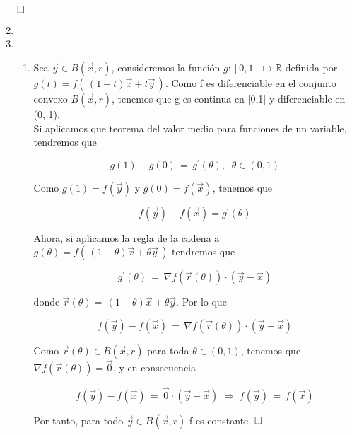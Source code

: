 \documentclass[12pt]{article}
\newcommand{\Rn}[1]{\mathbb{R}^{#1}}
\begin{document}
\begin{enumerate}
	  $\hfill \square$
	  
	  \pagebreak
	  
	  \item 
	  
	  \item 
	  \begin{enumerate}
	      \item Sea $\vec{y} \in B(\vec{x}, r)$, consideremos la función $g:[0,1] \mapsto \Rn{}$ definida por \linebreak $g(t) = f(\, (1-t)\vec{x} + t \vec{y} \, )$. Como f es diferenciable en el conjunto convexo $B(\vec{x}, r)$, tenemos que g es continua en [0,1] y diferenciable en (0, 1). \\
	      
	      Si aplicamos que teorema del valor medio para funciones de un variable, tendremos que 
	      
	      $$g(1) - g(0) \, = \, g^{\prime}(\theta), \;\; \theta \in (0,1)$$
	      
	      Como $g(1) = f(\vec{y})$ y $g(0) = f(\vec{x})$, tenemos que
	      
	      $$f(\vec{y}) - f(\vec{x}) = g^{\prime}(\theta)$$
	      
	      Ahora, si aplicamos la regla de la cadena a $g(\theta) =  f(\, (1-\theta)\vec{x} + \theta \vec{y} \, ) $ tendremos que
	      
	      $$ g^{\prime}(\theta) \, = \, \nabla f(\vec{r}(\theta)) \cdot (\vec{y} - \vec{x})$$
	      
	      donde $\vec{r}(\theta) = \, (1-\theta)\vec{x} + \theta \vec{y} $. Por lo que 
	      
	      $$f(\vec{y}) - f(\vec{x}) \, = \, \nabla f(\vec{r}(\theta)) \cdot (\vec{y} - \vec{x})$$
	      
	      Como $ \vec{r}(\theta) \in B(\vec{x}, r)$ para toda $\theta \in (0,1)$, tenemos que $\nabla f(\vec{r}(\theta)) = \vec{0}$, y en consecuencia
	      
	      $$ f(\vec{y}) - f(\vec{x}) \, = \, \vec{0} \cdot (\vec{y} - \vec{x}) \; \Longrightarrow \; f(\vec{y}) \, = \,  f(\vec{x}) $$
	      
	      Por tanto, para todo $\vec{y} \in B(\vec{x}, r)$ f es constante. $\hfill \square$
	      
	      
	      
	      
	      
	  \end{enumerate}
	   
	   
	   
	   
	\end{enumerate}
	
\end{document}
